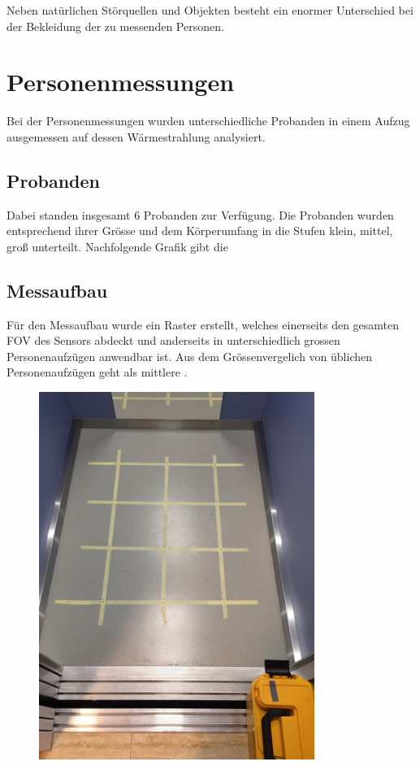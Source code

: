 Neben natürlichen Störquellen und Objekten besteht ein enormer Unterschied bei der Bekleidung der zu messenden Personen. 




\section{Personenmessungen}
Bei der Personenmessungen wurden unterschiedliche Probanden in einem Aufzug ausgemessen auf dessen Wärmestrahlung analysiert. 

\subsection{Probanden}
Dabei standen insgesamt 6 Probanden zur Verfügung. Die Probanden wurden entsprechend ihrer Grösse und dem Körperumfang in die Stufen klein, mittel, groß unterteilt. Nachfolgende Grafik gibt die 

\subsection{Messaufbau}

Für den Messaufbau wurde ein Raster erstellt, welches einerseits den gesamten \ac{FOV} des Sensors abdeckt und anderseits in unterschiedlich grossen Personenaufzügen anwendbar ist. Aus dem Grössenvergelich von üblichen Personenaufzügen geht als mittlere .






\begin{figure}[H]
	\centering
	\includegraphics[width=0.8\textwidth, angle=270]{fig/Messraster.JPG}
	\caption{}
	\label{fig:p1gallpositionsmean}
\end{figure}






